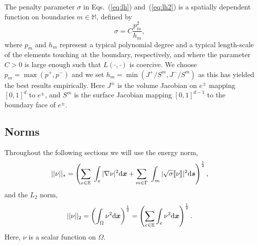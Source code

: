 The penalty parameter $\sigma$ in Eqs.~(\ref{eq:lh}) and~(\ref{eq:lh2}) is a spatially dependent function on boundaries $m\in\mathbb{M}$, defined by
\begin{equation}
\label{eq:penaltyparameter}
\sigma = C\frac{p_{m}^{2}}{h_{m}},
\end{equation}
where $p_m$ and $h_m$ represent a typical polynomial degree and a typical length-scale of the elements touching at the boundary, respectively,  and where the parameter $C>0$ is large enough such
that $L\left(\cdot, \cdot\right)$ is coercive. We choose $p_{m} = \max(p^+,p^-)$
and we set $h_{m} = \min(J^{+}/S^m,J^{-}/S^m)$ as this has yielded the best results empirically. Here $J^{\pm}$ is the
volume Jacobian on $e^\pm$ mapping $[0,1]^d$ to $e^\pm$, and $S^m$ is the
surface Jacobian mapping $[0,1]^{d-1}$ to the boundary face of $e^\pm$.
  

\subsection{Norms}


Throughout the following sections we will use the energy norm,
  \begin{equation}
  \label{eq:energynorm}
 ||\nu||_{*} = \left(\sum_{\substack{e \in \mathbb{E}}}\; \int_e |\nabla \nu |^{2} \mathrm{d}\boldsymbol{x} + \sum\limits_{m \in \Gamma}\; \int_m|\sqrt{\sigma} \llbracket \nu \rrbracket |^{2} \mathrm{d} \boldsymbol{s} \right)^{\frac{1}{2}},
 \end{equation}
and the $L_2$ norm,
 \begin{equation}
  \label{eq:l2norm}
  ||\nu||_{2}
  = \left(\int_{\Omega}\nu^2\mathrm{d}\boldsymbol{x}\right)^{\frac{1}{2}} 
 = \left(\sum_{\substack{e \in \mathbb{E}}}
  \int_{e}\nu^2\mathrm{d}\boldsymbol{x}\right)^{\frac{1}{2}}.
\end{equation}
Here, $\nu$ is a scalar function on $\Omega$.

